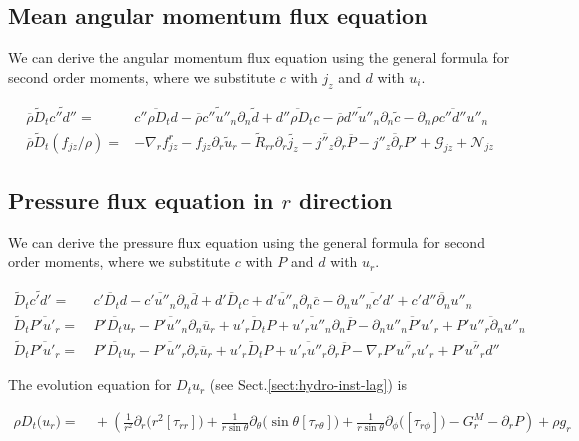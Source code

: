 \documentclass[10pt,paper=a4]{report}
\newcommand{\eht}{\overline}
\newcommand{\fht}{\widetilde}
\newcommand{\fav}{\widetilde}
\def\erho{\eht{\rho}}
\begin{document}
\subsection{Mean angular momentum flux equation}

We can derive the angular momentum flux equation using the general formula for second order moments, where we substitute $c$ with $j_z$ and $d$ with $u_i$.

\begin{align}
\overline{\rho}\widetilde{D}_t \widetilde{c''d''} = & \overline{c'' \rho D_t d} - \overline{\rho} \widetilde{c''u''_n}\partial_n \widetilde{d} + \overline{d'' \rho D_t c} - \overline{\rho} \widetilde{d''u''_n}\partial_n \widetilde{c} - \overline{\partial_n \rho c''d''u''_n} \\
\erho \fav{D}_t (f_{jz} / \rho) = & -\nabla_r f_{jz}^r  - f_{jz} \partial_r \fht{u}_r - \fht{R}_{rr} \partial_r \fht{j_z} -\eht{j''_z} \partial_r \eht{P} - \eht{j''_z \partial_r P'} + {\mathcal G_{jz}} + {\mathcal N_{jz}} \label{eq:rans_fjz}
\end{align}

\subsection{Pressure flux equation in $r$ direction}

We can derive the pressure flux equation using the general formula for second order moments, where we substitute $c$ with $P$ and $d$ with $u_r$.

\begin{align}
\widetilde{D}_t \widetilde{c'd'} = & \ \overline{c' D_t d} - \eht{c'u''_n} \partial_n \eht{d} + \eht{d'D_t c} + \eht{d'u''_n}\partial_n \eht{c} - \partial_n \eht{u''_n c'd'} + \eht{c'd''\partial_n u''_n} \nonumber \\ 
  \fht{D}_t \eht{P'u'_r} = & \ \eht{P'D_t u_r} - \eht{P'u''_n} \partial_n \eht{u}_r + \eht{u'_r D_t P} + \eht{u'_r u''_n} \partial_n \eht{P} - \partial_n \eht{u''_n P' u'_r} + \eht{P'u''_r \partial_n u''_n} \nonumber \\
  \fht{D}_t \eht{P'u'_r} = & \ \eht{P'D_t u_r} - \eht{P'u''_r} \partial_r \eht{u}_r + \eht{u'_r D_t P} + \eht{u'_r u''_r} \partial_r \eht{P} - \nabla_r \eht{P' u''_r u'_r} + \eht{P'u''_r d''} 
\end{align}

\noindent
The evolution equation for $D_t u_r$ (see Sect.\ref{sect:hydro-inst-lag}) is 

\begin{align}
\rho D_{t} \big(u_{r}\big) = & \ +\left( \frac{1}{r^{2}} \partial_{r} \big( r^{2} [\tau_{rr}]\big) + \frac{1}{r\sin{\theta}}\partial_{\theta}(\sin{\theta}[\tau_{r\theta}]\big) + \frac{1}{r\sin{\theta}}\partial_{\phi}\big([\tau_{r\phi}]\big) - G_r^M - \partial_{r} P \right) + \rho g_r 
\end{align}
\end{document}
